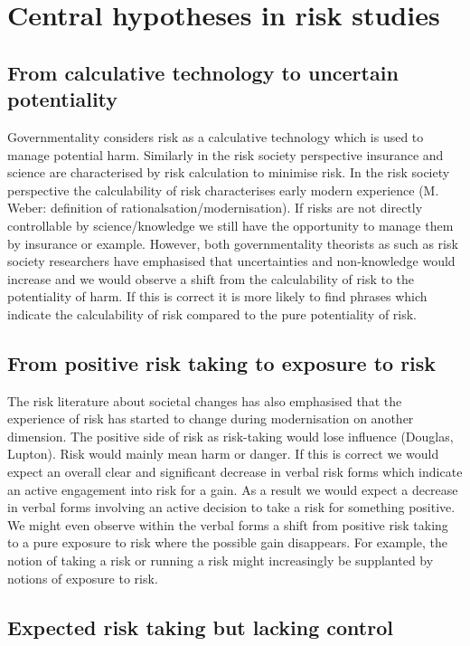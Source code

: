 \section{Central hypotheses in risk studies}

\subsection*{From calculative technology to uncertain potentiality}

Governmentality considers risk as a calculative technology which is used to manage potential harm. Similarly in the risk society perspective insurance and science are characterised by risk calculation to minimise risk. In the risk society perspective the calculability of risk characterises early modern experience (M. Weber: definition of rationalsation\slash modernisation). If risks are not directly controllable by science\slash knowledge we still have the opportunity to manage them by insurance or example. However, both governmentality theorists as such as risk society researchers have emphasised that uncertainties and non-knowledge would increase and we would observe a shift from the calculability of risk to the potentiality of harm. If this is correct it is more likely to find phrases which indicate the calculability of risk compared to the pure potentiality of risk. 

\subsection*{From positive risk taking to exposure to risk}

The risk literature about societal changes has also emphasised that the experience of risk has started to change during modernisation on another dimension. The positive side of risk as risk-taking would lose influence (Douglas, Lupton). Risk would mainly mean harm or danger. If this is correct we would expect an overall clear and significant decrease in verbal risk forms which indicate an active engagement into risk for a gain. As a result we would expect a decrease in verbal forms involving an active decision to take a risk for something positive. We might even observe within the verbal forms a shift from positive risk taking to a pure exposure to risk where the possible gain disappears. For example, the notion of taking a risk or running a risk might increasingly be supplanted by notions of exposure to risk.

\subsection*{Expected risk taking but lacking control}

